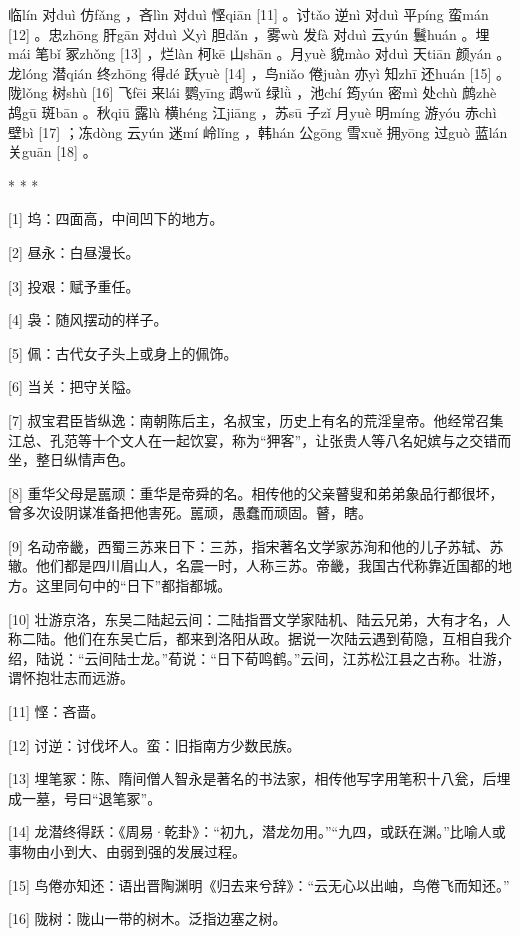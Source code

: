\documentclass[12pt,UTF8]{ctexbook}
\begin{document}
临lín 对duì 仿fǎng ，吝lìn 对duì 悭qiān [11] 。讨tǎo 逆nì 对duì 平píng 蛮mán [12] 。忠zhōng 肝gān 对duì 义yì 胆dǎn ，雾wù 发fà 对duì 云yún 鬟huán 。埋mái 笔bǐ 冢zhǒng [13] ，烂làn 柯kē 山shān 。月yuè 貌mào 对duì 天tiān 颜yán 。龙lóng 潜qián 终zhōng 得dé 跃yuè [14] ，鸟niǎo 倦juàn 亦yì 知zhī 还huán [15] 。陇lǒng 树shù [16] 飞fēi 来lái 鹦yīng 鹉wǔ 绿lǜ ，池chí 筠yún 密mì 处chù 鹧zhè 鸪gū 斑bān 。秋qiū 露lù 横héng 江jiāng ，苏sū 子zǐ 月yuè 明míng 游yóu 赤chì 壁bì [17] ；冻dòng 云yún 迷mí 岭lǐng ，韩hán 公gōng 雪xuě 拥yōng 过guò 蓝lán 关guān [18] 。



* * *



[1] 坞：四面高，中间凹下的地方。

[2] 昼永：白昼漫长。

[3] 投艰：赋予重任。

[4] 袅：随风摆动的样子。

[5] 佩：古代女子头上或身上的佩饰。

[6] 当关：把守关隘。

[7] 叔宝君臣皆纵逸：南朝陈后主，名叔宝，历史上有名的荒淫皇帝。他经常召集江总、孔范等十个文人在一起饮宴，称为“狎客”，让张贵人等八名妃嫔与之交错而坐，整日纵情声色。

[8] 重华父母是嚚顽：重华是帝舜的名。相传他的父亲瞽叟和弟弟象品行都很坏，曾多次设阴谋准备把他害死。嚚顽，愚蠢而顽固。瞽，瞎。

[9] 名动帝畿，西蜀三苏来日下：三苏，指宋著名文学家苏洵和他的儿子苏轼、苏辙。他们都是四川眉山人，名震一时，人称三苏。帝畿，我国古代称靠近国都的地方。这里同句中的“日下”都指都城。

[10] 壮游京洛，东吴二陆起云间：二陆指晋文学家陆机、陆云兄弟，大有才名，人称二陆。他们在东吴亡后，都来到洛阳从政。据说一次陆云遇到荀隐，互相自我介绍，陆说：“云间陆士龙。”荀说：“日下荀鸣鹤。”云间，江苏松江县之古称。壮游，谓怀抱壮志而远游。

[11] 悭：吝啬。

[12] 讨逆：讨伐坏人。蛮：旧指南方少数民族。

[13] 埋笔冢：陈、隋间僧人智永是著名的书法家，相传他写字用笔积十八瓮，后埋成一墓，号曰“退笔冢”。

[14] 龙潜终得跃：《周易·乾卦》：“初九，潜龙勿用。”“九四，或跃在渊。”比喻人或事物由小到大、由弱到强的发展过程。

[15] 鸟倦亦知还：语出晋陶渊明《归去来兮辞》：“云无心以出岫，鸟倦飞而知还。”

[16] 陇树：陇山一带的树木。泛指边塞之树。
\end{document}

